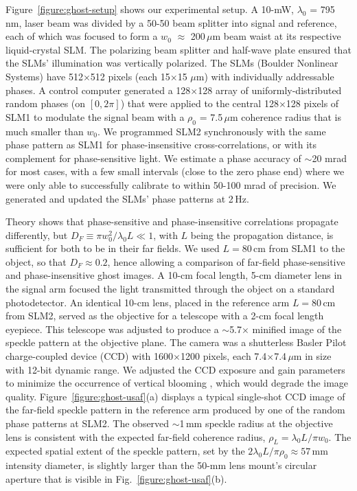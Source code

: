 Figure~\ref{figure:ghost-setup} shows our experimental setup.  A 10-mW, $\lambda_0$ = 795\,nm, laser beam was divided by a 50-50 beam splitter into signal and reference, each of which was focused to form a $w_0$ $\approx$ 200\,$\mu$m beam waist at its respective liquid-crystal SLM.  The polarizing beam splitter and half-wave plate ensured that the SLMs' illumination was vertically polarized. The SLMs (Boulder Nonlinear Systems) have 512$\times$512 pixels (each 15$\times$15 $\mu$m) with individually addressable phases. A control computer generated a 128$\times$128 array of uniformly-distributed random phases (on $[0, 2\pi]$) that were applied to the central 128$\times$128 pixels of SLM1 to modulate the signal beam with a $\rho_0$ = 7.5\,$\mu$m  coherence radius that is much smaller than $w_0$.  We programmed SLM2 synchronously with the same phase pattern as SLM1 for phase-insensitive cross-correlations, or with its complement for phase-sensitive light. We estimate a phase accuracy of $\sim$20 mrad for most cases, with a few small intervals (close to the zero phase end) where we were only able to successfully calibrate to within 50-100 mrad of precision. We generated and updated the SLMs' phase patterns at 2\,Hz. 

Theory \cite{erkmen-unified} shows that phase-sensitive and phase-insensitive correlations propagate differently, but $D_F \equiv \pi w_0^2/\lambda_0 L \ll 1$, with $L$ being the propagation distance, is sufficient for both to be in their far fields.  We used $L =80$\,cm from SLM1 to the object, so that $D_F \approx 0.2$, hence allowing a comparison of far-field phase-sensitive and phase-insensitive ghost images.  A 10-cm focal length, 5-cm diameter lens in the signal arm focused the light transmitted through the object on a standard photodetector. An identical 10-cm lens, placed in the reference arm $L = 80\,$cm from SLM2, served as the objective for a telescope with a 2-cm focal length eyepiece.  This telescope was adjusted to produce a $\sim$5.7$\times$ minified image of the speckle pattern at the objective plane. The camera was a shutterless Basler Pilot charge-coupled device (CCD) with 1600$\times$1200 pixels, each 7.4$\times$7.4\,$\mu$m in size with 12-bit dynamic range. We adjusted the CCD exposure and gain parameters to minimize the occurrence of vertical blooming \cite{janesick-astronomical}, which would degrade the image quality. Figure~\ref{figure:ghost-usaf}(a) displays a typical single-shot CCD image of the far-field speckle pattern in the reference arm produced by one of the random phase patterns at SLM2. The observed $\sim$1\,mm speckle radius at the objective lens is consistent with the expected far-field coherence radius, $\rho_L = \lambda_0 L/\pi w_0$. The expected spatial extent of the speckle pattern, set by the $2\lambda_0 L/\pi \rho_0 \approx 57$\,mm intensity diameter, is slightly larger than the 50-mm lens mount's circular aperture that is visible in Fig.~\ref{figure:ghost-usaf}(b).  

